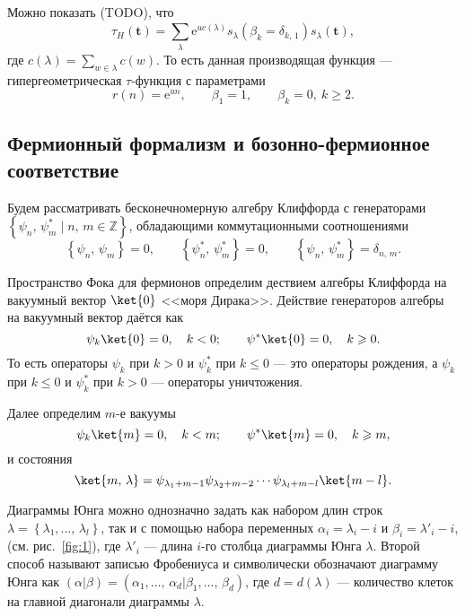 \documentclass[a5paper,twoside]{article}
\numberwithin{equation}{section}
\begin{document}
Можно показать (TODO), что
\begin{equation}
	\tau_H(\mathbf{t})=\sum_{\lambda}^{} \mathrm{e}^{u c(\lambda)}s_\lambda \left( \beta_k=\delta_{k,\,1} \right) 
	s_\lambda(\mathbf{t})
\label{eq:4}
,\end{equation} 
где $c(\lambda)= \sum_{w \in \lambda}^{} c(w)$. 
То есть данная производящая функция --- гипергеометрическая
$\tau$-функция с параметрами
\begin{equation}
	r(n)=\mathrm{e} ^{un},\qquad
	\beta_1=1,\qquad \beta_k=0,\ k\ge 2
.\end{equation} 
\subsection{Фермионный формализм и бозонно-фермионное соответствие}
Будем рассматривать бесконечномерную алгебру Клиффорда
с генераторами $\left\{ \psi_n,\,\psi^*_m \mid n,\,m \in \mathbb{Z} \right\} $, обладающими коммутационными соотношениями
\begin{equation}
\left\{ \psi_n,\,\psi_m \right\} =0,\qquad
\left\{ \psi_n^*,\,\psi^*_{m} \right\}=0,\qquad
\left\{ \psi_n,\,\psi_{m}^* \right\}=\delta_{n,\,m}
.\end{equation} 

Пространство Фока для фермионов определим дествием
алгебры Клиффорда на вакуумный вектор $\ket{0}$ <<моря Дирака>>. Действие генераторов алгебры на вакуумный вектор
даётся как
\begin{equation}
\psi_k\ket{0}=0,\quad k< 0;\qquad\psi^* \ket{0}=0,\quad
k\ge  0
.\end{equation} 
То есть операторы $\psi_k$ при $k>0$ и $\psi^*_k$ при
$k\le 0$ --- это операторы рождения, а $\psi_k$ при $k\le 0$ 
и $\psi_k^*$ при  $k> 0$ --- операторы уничтожения.

Далее определим $m$-е вакуумы
\begin{equation}
\psi_k\ket{m}=0,\quad k< m;\qquad\psi^* \ket{m}=0,\quad
k\ge  m
,\end{equation}
и состояния
\begin{equation}
	\ket{m,\,\lambda}= \psi_{\lambda_1+m-1}\psi_{\lambda_2+m-2}\cdots\psi_{\lambda_{l}+m-l}\ket{m-l}
.\end{equation} 

Диаграммы Юнга можно однозначно задать как набором длин строк $\lambda=\left\{ \lambda_1,\ldots,\, \lambda_{l} \right\} $, так и с помощью набора переменных
$\alpha_i=\lambda_i-i$ и $\beta_i=\lambda'_i-i$, (см. рис.~\ref{fig:1}), где $\lambda'_i$ --- длина $i$-го столбца
диаграммы Юнга $\lambda$.
Второй способ называют записью Фробениуса и символически
обозначают диаграмму Юнга как $\left( \alpha| \beta \right) =\left( \alpha_1,\ldots,\,\alpha_d|\beta_1,\ldots,\,\beta_d \right) $, где $d=d(\lambda)$ --- количество клеток на главной диагонали диаграммы $\lambda$.
\end{document}
